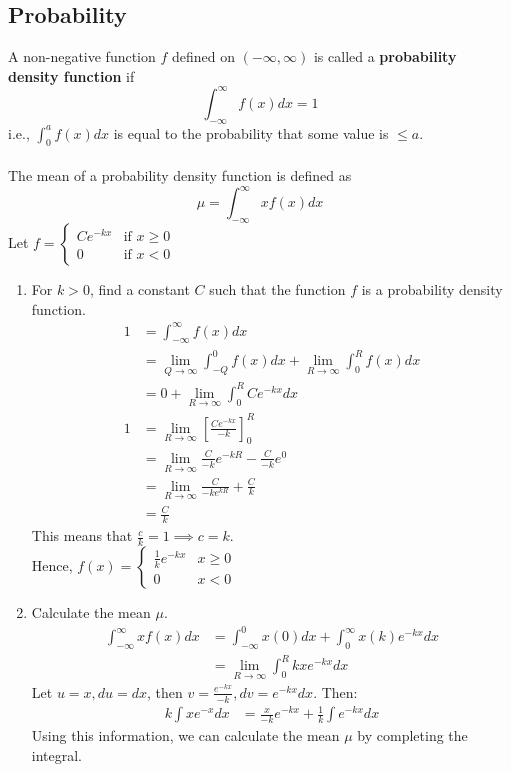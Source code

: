 \documentclass{article}
\begin{document}
\subsection{Probability}
A non-negative function $f$ defined on $(-\infty, \infty)$ is called a \textbf{probability density function} if
$$\int_{-\infty}^{\infty} f(x) dx = 1$$
i.e., $\int_0^a f(x) dx$ is equal to the probability that some value is $\leq a$.\\
\\
The mean of a probability density function is defined as
$$\mu = \int_{-\infty}^{\infty} x f(x) dx$$
\newpage
Let $f = \begin{cases}
Ce^{-kx} & \text{if }x \geq 0 \\
0 & \text{if } x < 0
\end{cases}$
\begin{enumerate}
    \item For $k > 0$, find a constant $C$ such that the function $f$ is a probability density function.
    \begin{align*}
        1 & = \int_{-\infty}^\infty f(x) dx\\
        & = \lim_{Q\to\infty} \int_{-Q}^0 f(x) dx + \lim_{R\to\infty} \int_0^R f(x) dx\\
        & = 0 + \lim_{R\to\infty} \int_0^R Ce^{-kx} dx\\
        1 & = \lim_{R\to\infty} \left[ \frac{Ce^{-kx}}{-k}\right]_0^R\\
        & = \lim_{R\to\infty} \frac{C}{-k} e^{-kR} - \frac{C}{-k}e^0\\
        & = \lim_{R\to\infty} \frac{C}{-ke^{kR}} + \frac{C}{k}\\
        & = \frac{C}{k}
    \end{align*}
    This means that $\frac{c}{k} = 1 \implies c = k$.\\
    Hence, $f(x) = \begin{cases}
    \frac{1}{k} e^{-kx} & x\geq 0\\
    0 & x < 0
    \end{cases}$
    
    \item Calculate the mean $\mu$.
    \begin{align*}
        \int_{-\infty}^\infty x f(x) dx & = \int_{-\infty}^0 x(0) dx + \int_0^\infty x(k)e^{-kx} dx\\
        & = \lim_{R\to\infty} \int_0^R kxe^{-kx} dx
    \end{align*}
    Let $u=x, du = dx$, then $v = \frac{e^{-kx}}{-k}, dv = e^{-kx} dx$. Then:
    \begin{align*}
        k \int xe^{-x} dx & = \frac{x}{-k} e^{-kx} + \frac{1}{k} \int e^{-kx} dx
    \end{align*}
    Using this information, we can calculate the mean $\mu$ by completing the integral.
\end{enumerate}
\end{document}
